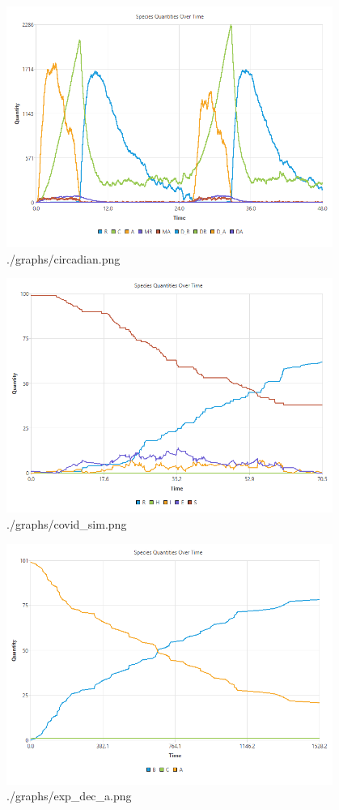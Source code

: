 \documentclass[a4paper]{article}
\begin{document}
  \begin{figure}[!htb]
    \centering
    \includegraphics[width=0.95\textwidth]{./graphs/circadian.png}
    \caption{./graphs/circadian.png}
  \end{figure}
  \begin{figure}[!htb]
    \centering
    \includegraphics[width=0.95\textwidth]{./graphs/covid_sim.png}
    \caption{./graphs/covid\_sim.png}
  \end{figure}
  \begin{figure}[!htb]
    \centering
    \includegraphics[width=0.95\textwidth]{./graphs/exp_dec_a.png}
    \caption{./graphs/exp\_dec\_a.png}
  \end{figure}
\end{document}
